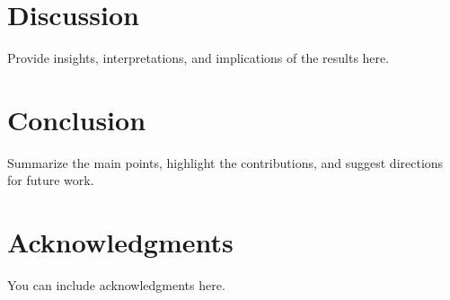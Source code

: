 \documentclass[12pt]{article}
\begin{document}


\section{Discussion}
Provide insights, interpretations, and implications of the results here.

\section{Conclusion}
Summarize the main points, highlight the contributions, and suggest directions for future work.

\section*{Acknowledgments}
You can include acknowledgments here.



\end{document}
